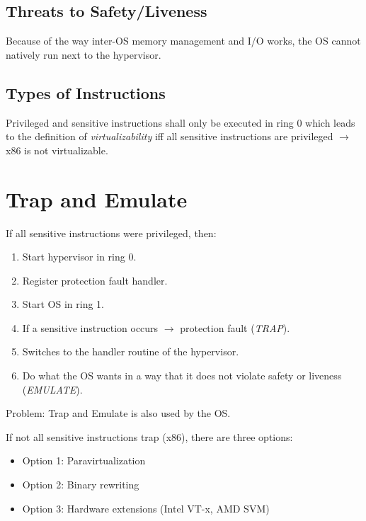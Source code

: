         \subsection{Threats to Safety/Liveness}
	        Because of the way inter-OS memory management and I/O works, the OS cannot natively run next to the hypervisor.
        
        \subsection{Types of Instructions}
	        Privileged and sensitive instructions shall only be executed in ring 0 which leads to the definition of \textit{virtualizability} iff all sensitive instructions are privileged \(\rightarrow\) x86 is not virtualizable.

    \section{Trap and Emulate}
        If all sensitive instructions were privileged, then:
        \begin{enumerate}
        	\item Start hypervisor in ring 0.
        	\item Register protection fault handler.
        	\item Start OS in ring 1.
        	\item If a sensitive instruction occurs \(\rightarrow\) protection fault (\textit{TRAP}).
        	\item Switches to the handler routine of the hypervisor.
        	\item Do what the OS wants in a way that it does not violate safety or liveness (\textit{EMULATE}).
        \end{enumerate}
        Problem: Trap and Emulate is also used by the OS.
        
        If not all sensitive instructions trap (x86), there are three options:
        \begin{itemize}
        	\item Option 1: Paravirtualization
        	\item Option 2: Binary rewriting
        	\item Option 3: Hardware extensions (Intel VT-x, AMD SVM)
        \end{itemize}
    
